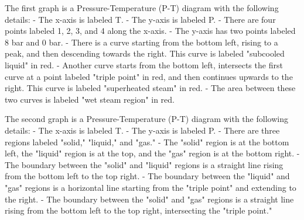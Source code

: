 The first graph is a Pressure-Temperature (P-T) diagram with the following details:
- The x-axis is labeled T.
- The y-axis is labeled P.
- There are four points labeled 1, 2, 3, and 4 along the x-axis.
- The y-axis has two points labeled 8 bar and 0 bar.
- There is a curve starting from the bottom left, rising to a peak, and then descending towards the right. This curve is labeled "subcooled liquid" in red.
- Another curve starts from the bottom left, intersects the first curve at a point labeled "triple point" in red, and then continues upwards to the right. This curve is labeled "superheated steam" in red.
- The area between these two curves is labeled "wet steam region" in red.

The second graph is a Pressure-Temperature (P-T) diagram with the following details:
- The x-axis is labeled T.
- The y-axis is labeled P.
- There are three regions labeled "solid," "liquid," and "gas."
- The "solid" region is at the bottom left, the "liquid" region is at the top, and the "gas" region is at the bottom right.
- The boundary between the "solid" and "liquid" regions is a straight line rising from the bottom left to the top right.
- The boundary between the "liquid" and "gas" regions is a horizontal line starting from the "triple point" and extending to the right.
- The boundary between the "solid" and "gas" regions is a straight line rising from the bottom left to the top right, intersecting the "triple point."